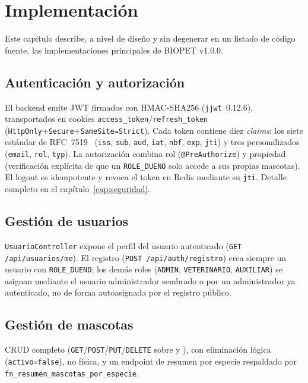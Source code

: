 \chapter{Implementaci\'on}
\label{cap:implementacion}

Este cap\'itulo describe, a nivel de dise\~no y sin degenerar en un listado
de c\'odigo fuente, las implementaciones principales de BIOPET v1.0.0.

\section{Autenticaci\'on y autorizaci\'on}

El backend emite JWT firmados con HMAC-SHA256 (\texttt{jjwt}~0.12.6),
transportados en cookies \texttt{access\_token}/\texttt{refresh\_token}
(\texttt{HttpOnly}+\texttt{Secure}+\texttt{SameSite=Strict}). Cada token
contiene diez \emph{claims}: los siete est\'andar de RFC~7519~\cite{rfc7519}
(\texttt{iss}, \texttt{sub}, \texttt{aud}, \texttt{iat}, \texttt{nbf},
\texttt{exp}, \texttt{jti}) y tres personalizados (\texttt{email},
\texttt{rol}, \texttt{typ}). La autorizaci\'on combina rol
(\texttt{@PreAuthorize}) y propiedad (verificaci\'on expl\'icita de que un
\texttt{ROLE\_DUENO} solo accede a sus propias mascotas). El logout es
idempotente y revoca el token en Redis mediante su \texttt{jti}. Detalle
completo en el cap\'itulo~\ref{cap:seguridad}.

\section{Gesti\'on de usuarios}

\texttt{UsuarioController} expone el perfil del usuario autenticado
(\texttt{GET /api/usuarios/me}). El registro (\texttt{POST
/api/auth/registro}) crea siempre un usuario con \texttt{ROLE\_DUENO}; los
dem\'as roles (\texttt{ADMIN}, \texttt{VETERINARIO}, \texttt{AUXILIAR}) se
asignan mediante el usuario administrador sembrado o por un administrador
ya autenticado, no de forma autoasignada por el registro p\'ublico.

\section{Gesti\'on de mascotas}

CRUD completo (\texttt{GET}\allowbreak/\texttt{POST}\allowbreak/\texttt{PUT}\allowbreak/\texttt{DELETE}
sobre  y ), con
eliminaci\'on l\'ogica (\texttt{activo=false}), no f\'isica, y un endpoint
de resumen por especie respaldado por \texttt{fn\_resumen\_mascotas\_por\_especie}.

